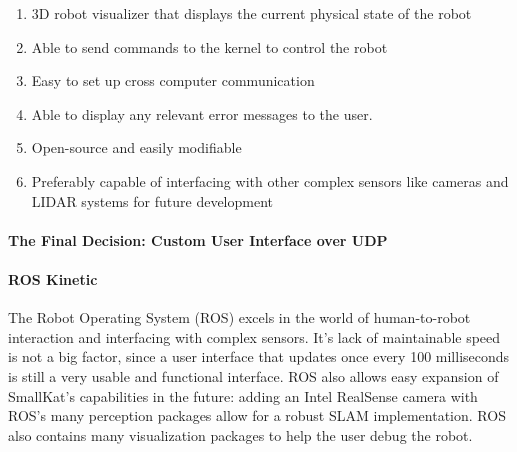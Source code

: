         \begin{enumerate}
            \item 3D robot visualizer that displays the current physical state of the robot
            \item Able to send commands to the kernel to control the robot
            \item Easy to set up cross computer communication
            \item Able to display any relevant error messages to the user.
            \item Open-source and easily modifiable
            \item Preferably capable of interfacing with other complex sensors like cameras and LIDAR systems for future development
        \end{enumerate}

        \paragraph*{The Final Decision: Custom User Interface over UDP}


        \paragraph*{ROS Kinetic}
        The Robot Operating System (ROS) excels in the world of human-to-robot interaction and interfacing with complex sensors. It's lack of maintainable speed is not a big factor, since a user interface that updates once every 100 milliseconds is still a very usable and functional interface. ROS also allows easy expansion of SmallKat's capabilities in the future: adding an Intel RealSense camera with ROS's many perception packages allow for a robust SLAM implementation. ROS also contains many visualization packages to help the user debug the robot.



